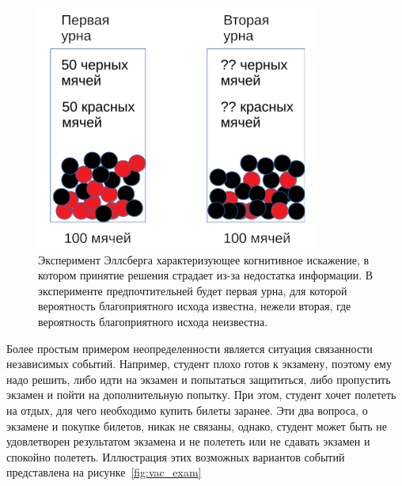 \begin{figure}[h!]
    \centering
    \includegraphics[width=0.5\linewidth]{pictures/pic_expmnt_ellsberg.png}
    \caption{Эксперимент Эллсберга характеризующее когнитивное искажение, в котором принятие решения
    страдает из-за недостатка информации. В эксперименте предпочтительней будет первая урна, для
    которой вероятность благоприятного исхода известна, нежели вторая, где вероятность
    благоприятного исхода неизвестна.}
    \label{fig:expmnt_ellsberg}
\end{figure}

Более простым примером неопределенности является ситуация связанности независимых событий. Например,
студент плохо готов к экзамену, поэтому ему надо решить, либо идти на экзамен и попытаться
защититься, либо пропустить экзамен и пойти на дополнительную попытку. При этом, студент хочет
полететь на отдых, для чего необходимо купить билеты заранее. Эти два вопроса, о экзамене и покупке
билетов, никак не связаны, однако, студент может быть не удовлетворен результатом экзамена и не полететь
или не сдавать экзамен и спокойно полететь. Иллюстрация этих возможных вариантов событий представлена
на рисунке~\ref{fig:vac_exam}


